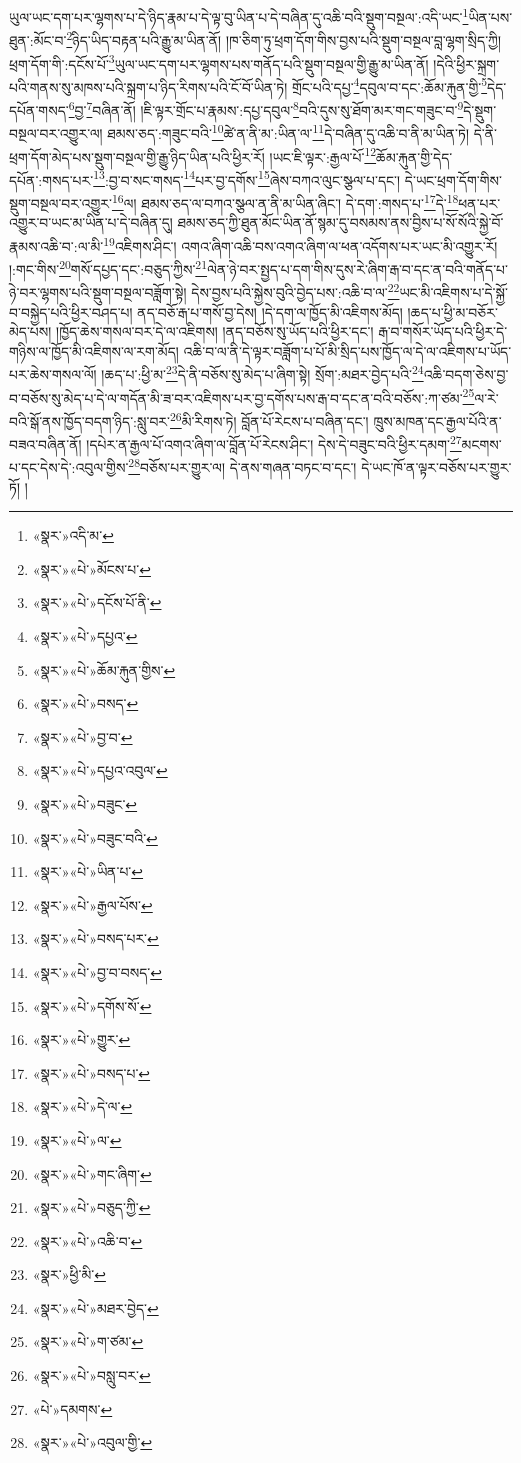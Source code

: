 ཡུལ་ཡང་དག་པར་ལྷགས་པ་དེ་ཉིད་རྣམ་པ་དེ་ལྟ་བུ་ཡིན་པ་དེ་བཞིན་དུ་འཆི་བའི་སྡུག་བསྔལ་:འདི་ཡང་\footnote{«སྣར་»འདི་མ་}ཡིན་པས་ཐུན་:མོང་བ་\footnote{«སྣར་»«པེ་»མོངས་པ་}ཉིད་ཡིད་བརྟན་པའི་རྒྱུ་མ་ཡིན་ནོ། །ཁ་ཅིག་ཏུ་ཕྲག་དོག་གིས་བྱས་པའི་སྡུག་བསྔལ་བླ་ལྷག་སྲིད་ཀྱི། ཕྲག་དོག་གི་:དངོས་པོ་\footnote{«སྣར་»«པེ་»དངོས་པོ་ནི་}ཡུལ་ཡང་དག་པར་ལྷགས་པས་གནོད་པའི་སྡུག་བསྔལ་གྱི་རྒྱུ་མ་ཡིན་ནོ། །དེའི་ཕྱིར་སྐྲག་པའི་གནས་སུ་མཁས་པའི་སྐྲག་པ་ཉིད་རིགས་པའི་ངོ་བོ་ཡིན་ཏེ། གྲོང་པའི་དཔྱ་\footnote{«སྣར་»«པེ་»དཔྱའ་}དབུལ་བ་དང་:ཆོམ་རྐུན་གྱི་\footnote{«སྣར་»«པེ་»ཆོམ་རྐུན་གྱིས་}དེད་དཔོན་གསད་\footnote{«སྣར་»«པེ་»བསད་}བྱ་\footnote{«སྣར་»«པེ་»བྱ་བ་}བཞིན་ནོ། །ཇི་ལྟར་གྲོང་པ་རྣམས་:དཔྱ་དབུལ་\footnote{«སྣར་»«པེ་»དཔྱའ་འབུལ་}བའི་དུས་སུ་ཐོག་མར་གང་གཟུང་བ་\footnote{«སྣར་»«པེ་»བཟུང་}དེ་སྡུག་བསྔལ་བར་འགྱུར་ལ། ཐམས་ཅད་:གཟུང་བའི་\footnote{«སྣར་»«པེ་»བཟུང་བའི་}ཚེ་ན་ནི་མ་:ཡིན་ལ་\footnote{«སྣར་»«པེ་»ཡིན་པ་}དེ་བཞིན་དུ་འཆི་བ་ནི་མ་ཡིན་ཏེ། དེ་ནི་ཕྲག་དོག་མེད་པས་སྡུག་བསྔལ་གྱི་རྒྱུ་ཉིད་ཡིན་པའི་ཕྱིར་རོ། །ཡང་ཇི་ལྟར་:རྒྱལ་པོ་\footnote{«སྣར་»«པེ་»རྒྱལ་པོས་}ཆོམ་རྐུན་གྱི་དེད་དཔོན་:གསད་པར་\footnote{«སྣར་»«པེ་»བསད་པར་}:བྱ་བ་སང་གསད་\footnote{«སྣར་»«པེ་»བྱ་བ་བསད་}པར་བྱ་དགོས་\footnote{«སྣར་»«པེ་»དགོས་སོ་}ཞེས་བཀའ་ལུང་སྩལ་པ་དང་། དེ་ཡང་ཕྲག་དོག་གིས་སྡུག་བསྔལ་བར་འགྱུར་\footnote{«སྣར་»«པེ་»གྱུར་}ལ། ཐམས་ཅད་ལ་བཀའ་སྩལ་ན་ནི་མ་ཡིན་ཞིང་། དེ་དག་:གསད་པ་\footnote{«སྣར་»«པེ་»བསད་པ་}དེ་\footnote{«སྣར་»«པེ་»དེ་ལ་}ཕན་པར་འགྱུར་བ་ཡང་མ་ཡིན་པ་དེ་བཞིན་དུ། ཐམས་ཅད་ཀྱི་ཐུན་མོང་ཡིན་ནོ་སྙམ་དུ་བསམས་ནས་བྱིས་པ་སོ་སོའི་སྐྱེ་བོ་རྣམས་འཆི་བ་:ལ་མི་\footnote{«སྣར་»«པེ་»ལ་}འཇིགས་ཤིང་། འགའ་ཞིག་འཆི་བས་འགའ་ཞིག་ལ་ཕན་འདོགས་པར་ཡང་མི་འགྱུར་རོ། །:གང་གིས་\footnote{«སྣར་»«པེ་»གང་ཞིག་}གསོ་དཔྱད་དང་:བཅུད་ཀྱིས་\footnote{«སྣར་»«པེ་»བཅུད་ཀྱི་}ལེན་ཉེ་བར་སྤྱད་པ་དག་གིས་དུས་རེ་ཞིག་རྒ་བ་དང་ན་བའི་གནོད་པ་ཉེ་བར་ལྷགས་པའི་སྡུག་བསྔལ་བཟློག་སྟེ། དེས་བྱས་པའི་སྐྱེས་བུའི་བྱེད་པས་:འཆི་བ་ལ་\footnote{«སྣར་»«པེ་»འཆི་བ་}ཡང་མི་འཇིགས་པ་དེ་སྐྱོ་བ་བསྐྱེད་པའི་ཕྱིར་བཤད་པ། ནད་བཅོ་རྒ་པ་གསོ་བྱ་དེས། །དེ་དག་ལ་ཁྱོད་མི་འཇིགས་མོད། །ཆད་པ་ཕྱི་མ་བཅོར་མེད་པས། །ཁྱོད་ཆེས་གསལ་བར་དེ་ལ་འཇིགས། །ནད་བཅོས་སུ་ཡོད་པའི་ཕྱིར་དང་། རྒ་བ་གསོར་ཡོད་པའི་ཕྱིར་དེ་གཉིས་ལ་ཁྱོད་མི་འཇིགས་ལ་རག་མོད། འཆི་བ་ལ་ནི་དེ་ལྟར་བཟློག་པ་པོ་མི་སྲིད་པས་ཁྱོད་ལ་དེ་ལ་འཇིགས་པ་ཡོད་པར་ཆེས་གསལ་ལོ། །ཆད་པ་:ཕྱི་མ་\footnote{«སྣར་»ཕྱི་མི་}དེ་ནི་བཅོས་སུ་མེད་པ་ཞིག་སྟེ། སྲོག་:མཐར་བྱེད་པའི་\footnote{«སྣར་»«པེ་»མཐར་བྱེད་}འཆི་བདག་ཅེས་བྱ་བ་བཅོས་སུ་མེད་པ་དེ་ལ་གདོན་མི་ཟ་བར་འཇིགས་པར་བྱ་དགོས་པས་རྒ་བ་དང་ན་བའི་བཅོས་:ཀ་ཙམ་\footnote{«སྣར་»«པེ་»ག་ཙམ་}ལ་རེ་བའི་སྒོ་ནས་ཁྱོད་བདག་ཉིད་:སླུ་བར་\footnote{«སྣར་»«པེ་»བསླུ་བར་}མི་རིགས་ཏེ། བློན་པོ་རེངས་པ་བཞིན་དང་། ཁྲུས་མཁན་དང་རྒྱལ་པོའི་ན་བཟའ་བཞིན་ནོ། །དཔེར་ན་རྒྱལ་པོ་འགའ་ཞིག་ལ་བློན་པོ་རེངས་ཤིང་། དེས་དེ་བཟུང་བའི་ཕྱིར་དམག་\footnote{«པེ་»དམགས་}མངགས་པ་དང་དེས་དེ་:འབུལ་གྱིས་\footnote{«སྣར་»«པེ་»འབུལ་གྱི་}བཅོས་པར་གྱུར་ལ། དེ་ནས་གཞན་བཏང་བ་དང་། དེ་ཡང་ཁོ་ན་ལྟར་བཅོས་པར་གྱུར་ཏོ། །
